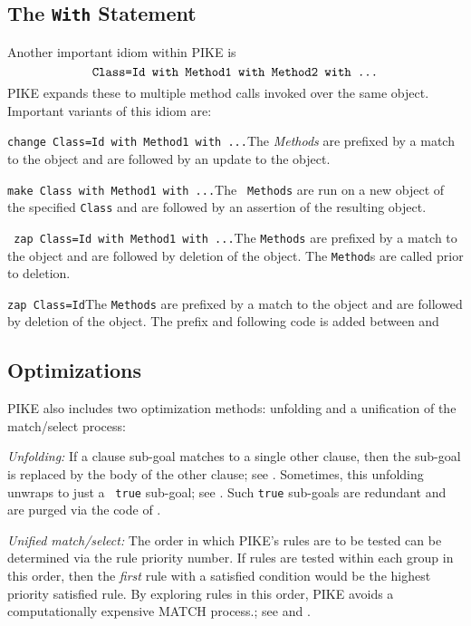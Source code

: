\documentclass[twocolumn,global]{sys/svjour}
\begin{document}

\subsection{The {\tt With} Statement}

Another important idiom within PIKE is \[\mbox{{\tt Class=Id with
Method1 with Method2 with ...}}\] PIKE expands these to multiple
method calls invoked over the same object. Important variants of this
idiom are: \bi \item \mbox{{\tt change Class=Id with Method1 with
...}}\newline The {\em Methods} are prefixed  by a match to the
object   and are followed by an update to the object. \item
\mbox{{\tt make Class  with Method1 with ...}}\newline The {\tt
Methods} are run on a new object of the specified {\tt Class} and are
followed by an assertion of the resulting object. \item \mbox{{\tt
zap Class=Id  with Method1 with ...}}\newline The {\tt Methods} are
prefixed  by a match to the object   and are followed by deletion of
the object. The {\tt Method}s are called prior to deletion. \item
\mbox{{\tt zap Class=Id}}\newline The {\tt Methods} are prefixed  by
a match to the object   and are followed by deletion of the object.
\ei The prefix and following code is added between
 and 


\subsection{Optimizations}

PIKE also includes two optimization methods: unfolding and a
unification of  the match/select process: \bd \item[{\em Unfolding:}]
If a clause sub-goal matches to a single other clause, then the
sub-goal is replaced by the body of the other clause; see
. Sometimes, this unfolding unwraps to just a {\tt
true} sub-goal; see . Such {\tt true} sub-goals
are redundant and are purged via the code of .
\item[{\em Unified match/select:}]  The order in which PIKE's rules
are to be tested can be determined via the rule priority number. If
rules are tested within each group in this order, then the {\em
first} rule with a satisfied condition would be the highest priority
satisfied rule. By exploring rules in this order, PIKE avoids a
computationally expensive MATCH process.; see
  and   .
\ed
\end{document}
